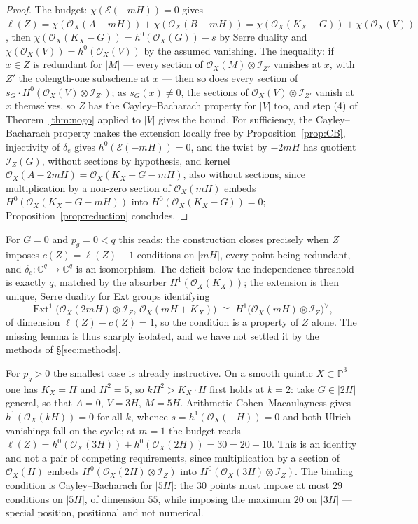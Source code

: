 \documentclass{amsart}
\theoremstyle{definition}
\newcommand{\OO}{\mathcal{O}}
\newcommand{\EE}{\mathcal{E}}
\newcommand{\II}{\mathcal{I}}
\newcommand{\CC}{\mathbb{C}}
\newcommand{\PP}{\mathbb{P}}
\newcommand{\Ext}{\operatorname{Ext}}
\newcommand{\len}{\ell}
\begin{document}
\begin{proof}
The budget: $\chi(\EE(-mH))=0$ gives $\len(Z)=\chi(\OO_X(A-mH))+\chi(\OO_X(B-mH))=\chi(\OO_X(K_X-G))+\chi(\OO_X(V))$, then $\chi(\OO_X(K_X-G))=h^0(\OO_X(G))-s$ by Serre duality and $\chi(\OO_X(V))=h^0(\OO_X(V))$ by the assumed vanishing. The inequality: if $x\in Z$ is redundant for $|M|$ --- every section of $\OO_X(M)\otimes\II_{Z'}$ vanishes at $x$, with $Z'$ the colength-one subscheme at $x$ --- then so does every section of $s_G\cdot H^0(\OO_X(V)\otimes\II_{Z'})$; as $s_G(x)\neq0$, the sections of $\OO_X(V)\otimes\II_{Z'}$ vanish at $x$ themselves, so $Z$ has the Cayley--Bacharach property for $|V|$ too, and step (4) of Theorem~\ref{thm:nogo} applied to $|V|$ gives the bound. For sufficiency, the Cayley--Bacharach property makes the extension locally free by Proposition~\ref{prop:CB}, injectivity of $\delta_e$ gives $h^0(\EE(-mH))=0$, and the twist by $-2mH$ has quotient $\II_Z(G)$, without sections by hypothesis, and kernel $\OO_X(A-2mH)=\OO_X(K_X-G-mH)$, also without sections, since multiplication by a non-zero section of $\OO_X(mH)$ embeds $H^0(\OO_X(K_X-G-mH))$ into $H^0(\OO_X(K_X-G))=0$; Proposition~\ref{prop:reduction} concludes.
\end{proof}

For $G=0$ and $p_g=0<q$ this reads: the construction closes precisely when $Z$ imposes $c(Z)=\len(Z)-1$ conditions on $|mH|$, every point being redundant, and $\delta_e:\CC^q\to\CC^q$ is an isomorphism. The deficit below the independence threshold is exactly $q$, matched by the absorber $H^1(\OO_X(K_X))$; the extension is then unique, Serre duality for Ext groups identifying
\[
\Ext^1\bigl(\OO_X(2mH)\otimes\II_Z,\,\OO_X(mH+K_X)\bigr)\;\cong\;H^1\bigl(\OO_X(mH)\otimes\II_Z\bigr)^\vee ,
\]
of dimension $\len(Z)-c(Z)=1$, so the condition is a property of $Z$ alone. The missing lemma is thus sharply isolated, and we have not settled it by the methods of \S\ref{sec:methods}.

For $p_g>0$ the smallest case is already instructive. On a smooth quintic $X\subset\PP^3$ one has $K_X=H$ and $H^2=5$, so $kH^2>K_X\cdot H$ first holds at $k=2$: take $G\in|2H|$ general, so that $A=0$, $V=3H$, $M=5H$. Arithmetic Cohen--Macaulayness gives $h^1(\OO_X(kH))=0$ for all $k$, whence $s=h^1(\OO_X(-H))=0$ and both Ulrich vanishings fall on the cycle; at $m=1$ the budget reads $\len(Z)=h^0(\OO_X(3H))+h^0(\OO_X(2H))=30=20+10$. This is an identity and not a pair of competing requirements, since multiplication by a section of $\OO_X(H)$ embeds $H^0(\OO_X(2H)\otimes\II_Z)$ into $H^0(\OO_X(3H)\otimes\II_Z)$. The binding condition is Cayley--Bacharach for $|5H|$: the $30$ points must impose at most $29$ conditions on $|5H|$, of dimension $55$, while imposing the maximum $20$ on $|3H|$ --- special position, positional and not numerical.
\end{document}
